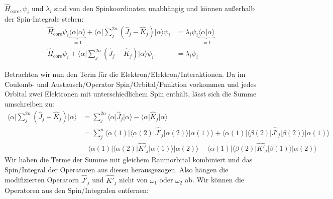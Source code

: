 $\hat{H}_{\text{core}}, \psi_i$ und $\lambda_i$ sind von den Spinkoordinaten unabhängig und
können außerhalb der Spin-Integrale stehen:
\begin{align}
  \hat{H}_{\text{core}} \psi_i \underbrace{\langle \alpha \vert \alpha \rangle}_{=1} +
  \langle \alpha \vert \sum_j^{2n} 
  \left( \hat{J}_j - \hat{K}_j \right) \vert \alpha \rangle \psi_i 
  &= \lambda_i \psi_i \underbrace{\langle \alpha \vert \alpha \rangle}_{=1} \nonumber\\
  \hat{H}_{\text{core}} \psi_i + \langle \alpha \vert \sum_j^{2n}
  \left( \hat{J}_j - \hat{K}_j \right) \vert \alpha \rangle \psi_i 
  &= \lambda_i \psi_i
\end{align}

Betrachten wir nun den Term für die Elektron\-/Elektron\-/Interaktionen.
Da im Coulomb- und Austausch\-/Operator Spin\-/Orbital\-/Funktion vorkommen und
jedes Orbital zwei Elektronen mit unterschiedlichem Spin enthält, lässt sich die Summe umschreiben zu:
\begin{align*}
  \langle \alpha \vert \sum_j^{2n} \left( \hat{J}_j - \hat{K}_j \right) \vert \alpha \rangle
  &= \sum_j^{2n} \langle \alpha \vert \hat{J}_j \vert \alpha \rangle
  - \langle \alpha \vert \hat{K}_j \vert \alpha \rangle \\
  &= \sum_j^{n} 
  \langle \alpha(1) \vert \langle \alpha(2) \vert \hat{J'}_j \vert \alpha(2) \rangle \vert \alpha(1) \rangle
  + \langle \alpha(1) \vert \langle \beta(2) \vert \hat{J'}_j \vert \beta(2) \rangle \vert \alpha(1) \rangle\\
  &- \langle \alpha(1) \vert \langle \alpha(2) \vert \hat{K'}_j \vert \alpha(1) \rangle \vert \alpha(2) \rangle
  - \langle \alpha(1) \vert \langle \beta(2) \vert \hat{K'}_j \vert \beta(1) \rangle \vert \alpha(2) \rangle
\end{align*}
Wir haben die Terme der Summe mit gleichem Raumorbital kombiniert und
das Spin\-/Integral der Operatoren aus diesen herausgezogen.
Also hängen die modifizierten Operatorn $\hat{J'}_j$ und $\hat{K'}_j$ nicht von $\omega_1$ oder $\omega_2$ ab.
Wir können die Operatoren aus den Spin\-/Integralen entfernen:
